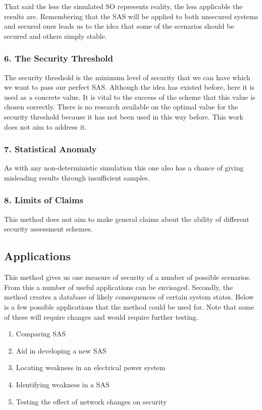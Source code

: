 \documentclass[a4paper,oneside,12pt]{report}
\begin{document}
That said the less the simulated SO represents reality, the less applicable the results are. Remembering that the SAS will be applied to both unsecured systems and secured ones leads us to the idea that some of the scenarios should be secured and others simply stable.

\subsubsection{6. The Security Threshold}

The security threshold is the minimum level of security that we can have which we want to pass our perfect SAS. Although the idea has existed before, here it is used as a concrete value. It is vital to the success of the scheme that this value is chosen correctly. There is no research available on the optimal value for the security threshold because it has not been used in this way before. This work does not aim to address it.

\subsubsection{7. Statistical Anomaly}

As with any non-deterministic simulation this one also has a chance of giving misleading results through insufficient samples.

\subsubsection{8. Limits of Claims}

This method does not aim to make general claims about the ability of different security assessment schemes.

\subsection{Applications}

This method gives us one measure of security of a number of possible scenarios. From this a number of useful applications can be envisaged. Secondly, the method creates a database of likely consequences of certain system states. Below is a few possible applications that the method could be used for. Note that some of these will require changes and would require further testing.

\begin{enumerate}
\item Comparing SAS
\item Aid in developing a new SAS
\item Locating weakness in an electrical power system
\item Identifying weakness in a SAS
\item Testing the effect of network changes on security
\end{enumerate}
\end{document}
